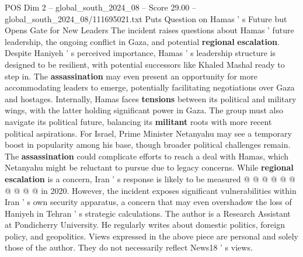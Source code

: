 \begin{textsample}{POS Dim 2 – global\_south\_2024\_08 – Score 29.00 – global\_south\_2024\_08/111695021.txt}
Puts Question on Hamas ' s Future but Opens Gate for New Leaders The incident raises questions about Hamas ' future leadership, the ongoing conflict in Gaza, and potential \textbf{regional} \textbf{escalation}.
Despite Haniyeh ' s perceived importance, Hamas ' s leadership structure is designed to be resilient, with potential successors like Khaled Mashal ready to step in.
The \textbf{assassination} may even present an opportunity for more accommodating leaders to emerge, potentially facilitating negotiations over Gaza and hostages.
Internally, Hamas faces \textbf{tensions} between its political and military wings, with the latter holding significant power in Gaza.
The group must also navigate its political future, balancing its \textbf{militant} roots with more recent political aspirations.
For Israel, Prime Minister Netanyahu may see a temporary boost in popularity among his base, though broader political challenges remain.
The \textbf{assassination} could complicate efforts to reach a deal with Hamas, which Netanyahu might be reluctant to pursue due to legacy concerns.
While \textbf{regional} \textbf{escalation} is a concern, Iran ' s response is likely to be measured @ @ @ @ @ @ @ @ @ @ in 2020.
However, the incident exposes significant vulnerabilities within Iran ' s own security apparatus, a concern that may even overshadow the loss of Haniyeh in Tehran ' s strategic calculations.
The author is a Research Assistant at Pondicherry University.
He regularly writes about domestic politics, foreign policy, and geopolitics.
Views expressed in the above piece are personal and solely those of the author.
They do not necessarily reflect News18 ' s views.

\end{textsample}
